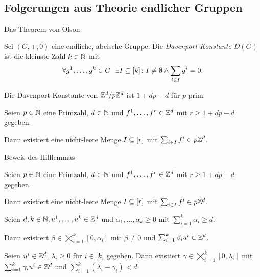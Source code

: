\subsection{Folgerungen aus Theorie endlicher Gruppen}

\begin{frame}{Das Theorem von Olson}

	\begin{definition}
		Sei $(G,+,0)$ eine endliche, abelsche Gruppe.
		Die {\em Davenport-Konstante $D(G)$} ist die kleinste Zahl $k\in\mathbb{N}$ mit 
		$$
		\forall g^1,\dots,g^k \in G~~\exists I\subseteq[k]\colon I\neq\emptyset \wedge \sum_{i\in I}g^i=0 .
		$$
	\end{definition}

	\begin{theorem}[Olson, 1969]
		Die Davenport-Konstante von $\mathbb{Z}^d/p\mathbb{Z}^d$ ist $1+dp-d$ für $p$ prim.
	\end{theorem}

	\pause
	\begin{korollar}
		Seien $p\in\mathbb{N}$ eine Primzahl, $d\in\mathbb{N}$ und $f^1,\dots,f^r\in\mathbb{Z}^d$ mit $r\geq 1+dp-d$ gegeben.
		
		Dann existiert eine nicht-leere Menge $I\subseteq[r]$ mit $\sum_{i\in I}f^i\in p\mathbb{Z}^d$.
	\end{korollar}
\end{frame}

\begin{frame}{Beweis des Hilflemmas}
\begin{korollar}
Seien $p\in\mathbb{N}$ eine Primzahl, $d\in\mathbb{N}$ und $f^1,\dots,f^r\in\mathbb{Z}^d$ mit $r\geq 1+dp-d$ gegeben.

Dann existiert eine nicht-leere Menge $I\subseteq[r]$ mit $\sum_{i\in I}f^i\in p\mathbb{Z}^d$.
\end{korollar}
\begin{lemma}\label{lem:olson}
	Seien $d,k\in\mathbb{N}, u^1,\dots, u^k\in\mathbb{Z}^d$ und $\alpha_1,\dots,\alpha_k\geq0$ mit $\sum_{i=1}^k \alpha_i\geq d$.
	
	Dann existiert $\beta\in\bigtimes_{i=1}^k[0,\alpha_i]$ mit $\beta\neq0$ und $\sum_{i=1}^k\beta_i u^i \in\mathbb{Z}^d$.
\end{lemma}
\pause
\begin{lemma}\label{lem:maxgamma}
	Seien $u^i\in\mathbb{Z}^d$, $\lambda_i\geq0$ für $i\in[k]$ gegeben.
	Dann existiert $\gamma\in\bigtimes_{i=1}^k [0,\lambda_i]$ mit $\sum_{i=1}^k \gamma_i u^i\in\mathbb{Z}^d$ und  $\sum_{i=1}^k(\lambda_i-\gamma_i)<d$.
\end{lemma}
\end{frame}